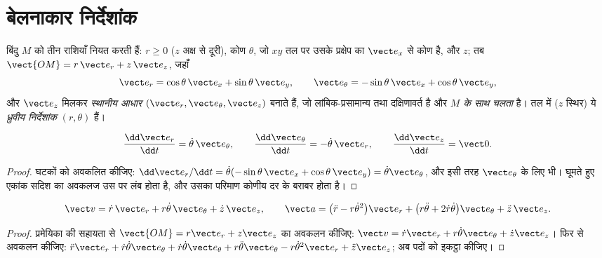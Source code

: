 \section{बेलनाकार निर्देशांक}

\begin{definition}[बेलनाकार निर्देशांक और स्थानीय आधार]\label{def:b1:point-kinematics:cylindrical}
बिंदु $M$ को तीन राशियाँ नियत करती हैं: $r \geq 0$ ($z$ अक्ष से दूरी), कोण
$\theta$, जो $xy$ तल पर उसके प्रक्षेप का $\vect e_x$ से कोण है, और $z$; तब
$\vect{OM} = r\,\vect e_r + z\,\vect e_z$, जहाँ
\[
\vect e_r = \cos\theta\,\vect e_x + \sin\theta\,\vect e_y, \qquad
\vect e_\theta = -\sin\theta\,\vect e_x + \cos\theta\,\vect e_y,
\]
और $\vect e_z$ मिलकर \emph{स्थानीय आधार} $(\vect e_r, \vect e_\theta,
\vect e_z)$ बनाते हैं, जो लांबिक-प्रसामान्य तथा दक्षिणावर्त है और
\emph{$M$ के साथ चलता} है। तल में ($z$ स्थिर) ये \emph{ध्रुवीय निर्देशांक}
$(r, \theta)$ हैं।
\end{definition}

\begin{lemma}[स्थानीय आधार के अवकलज]\label{lem:b1:point-kinematics:basisderiv}
\[
\frac{\dd\vect e_r}{\dd t} = \dot\theta\,\vect e_\theta, \qquad
\frac{\dd\vect e_\theta}{\dd t} = -\dot\theta\,\vect e_r, \qquad
\frac{\dd\vect e_z}{\dd t} = \vect 0 .
\]
\end{lemma}

\begin{proof}
घटकों को अवकलित कीजिए: $\dd\vect e_r/\dd t = \dot\theta(-\sin\theta\,
\vect e_x + \cos\theta\,\vect e_y) = \dot\theta\vect e_\theta$, और इसी तरह
$\vect e_\theta$ के लिए भी। घूमते हुए एकांक सदिश का अवकलज उस पर लंब होता है,
और उसका परिमाण कोणीय दर के बराबर होता है।
\end{proof}

\begin{theorem}[बेलनाकार निर्देशांकों में वेग और त्वरण]\label{thm:b1:point-kinematics:cylindrical}
\[
\vect v = \dot r\,\vect e_r + r\dot\theta\,\vect e_\theta + \dot z\,\vect e_z,
\qquad
\vect a = \big(\ddot r - r\dot\theta^2\big)\vect e_r
+ \big(r\ddot\theta + 2\dot r\dot\theta\big)\vect e_\theta + \ddot z\,\vect e_z .
\]
\end{theorem}

\begin{proof}
प्रमेयिका की सहायता से $\vect{OM} = r\vect e_r + z\vect e_z$ का अवकलन कीजिए:
$\vect v = \dot r\vect e_r + r\dot\theta\vect e_\theta + \dot z\vect e_z$।
फिर से अवकलन कीजिए: $\ddot r\vect e_r + \dot r\dot\theta\vect e_\theta +
\dot r\dot\theta\vect e_\theta + r\ddot\theta\vect e_\theta - r\dot\theta^2
\vect e_r + \ddot z\vect e_z$; अब पदों को इकट्ठा कीजिए।
\end{proof}


